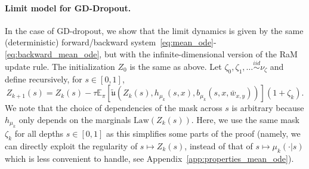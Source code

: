 \documentclass[a4paper,11pt]{article}
\newcommand{\1}{\mathbbm{1}}
\newcommand{\E}{\mathbb{E}}
\theoremstyle{definition}
\theoremstyle{remark}
\begin{document}
\paragraph{Limit model for GD-Dropout.} In the case of GD-dropout, we show that the limit dynamics is given by the same (deterministic) forward/backward system~\eqref{eq:mean_ode}-\eqref{eq:backward_mean_ode}, but with the infinite-dimensional version of the RaM update rule. The initialization $Z_0$ is the same as above.
Let $\zeta_0,\zeta_1,\dots \overset{iid}{\sim} \nu_\zeta$ 
and define recursively, for $s\in[0,1]$,
\begin{equation}\label{eq:limit_update_rule_ram}
  Z_{k+1}(s) = Z_k(s) - \tau \E_{\pi}[\tilde{\mathfrak{u}}(Z_k(s), h_{\mu_k}(s, x), b_{\mu_k}(s, x, \bar{w}_{x,y}))](1+\zeta_k).
\end{equation}
We note that the choice of dependencies of the mask across $s$ is arbitrary because $h_{\mu_k}$ only depends on the marginals $ \mathrm{Law}(Z_k(s))$. Here, we use the same mask $\zeta_k$ for all depths $s\in[0,1]$ as this simplifies some parts of the proof (namely, we can directly exploit the regularity of $s\mapsto Z_k(s)$, instead of that of $s\mapsto \mu_k(\cdot|s)$ which is less convenient to handle, see Appendix~\ref{app:properties_mean_ode}).
\end{document}
